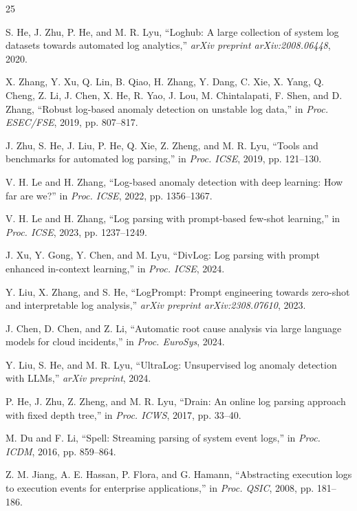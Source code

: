 \documentclass[conference]{IEEEtran}
\begin{document}


\begin{thebibliography}{25}

S. He, J. Zhu, P. He, and M. R. Lyu, ``Loghub: A large collection of system log datasets towards automated log analytics,'' \textit{arXiv preprint arXiv:2008.06448}, 2020.

X. Zhang, Y. Xu, Q. Lin, B. Qiao, H. Zhang, Y. Dang, C. Xie, X. Yang, Q. Cheng, Z. Li, J. Chen, X. He, R. Yao, J. Lou, M. Chintalapati, F. Shen, and D. Zhang, ``Robust log-based anomaly detection on unstable log data,'' in \textit{Proc. ESEC/FSE}, 2019, pp. 807--817.

J. Zhu, S. He, J. Liu, P. He, Q. Xie, Z. Zheng, and M. R. Lyu, ``Tools and benchmarks for automated log parsing,'' in \textit{Proc. ICSE}, 2019, pp. 121--130.

V. H. Le and H. Zhang, ``Log-based anomaly detection with deep learning: How far are we?'' in \textit{Proc. ICSE}, 2022, pp. 1356--1367.

V. H. Le and H. Zhang, ``Log parsing with prompt-based few-shot learning,'' in \textit{Proc. ICSE}, 2023, pp. 1237--1249.

J. Xu, Y. Gong, Y. Chen, and M. Lyu, ``DivLog: Log parsing with prompt enhanced in-context learning,'' in \textit{Proc. ICSE}, 2024.

Y. Liu, X. Zhang, and S. He, ``LogPrompt: Prompt engineering towards zero-shot and interpretable log analysis,'' \textit{arXiv preprint arXiv:2308.07610}, 2023.

J. Chen, D. Chen, and Z. Li, ``Automatic root cause analysis via large language models for cloud incidents,'' in \textit{Proc. EuroSys}, 2024.

Y. Liu, S. He, and M. R. Lyu, ``UltraLog: Unsupervised log anomaly detection with LLMs,'' \textit{arXiv preprint}, 2024.

P. He, J. Zhu, Z. Zheng, and M. R. Lyu, ``Drain: An online log parsing approach with fixed depth tree,'' in \textit{Proc. ICWS}, 2017, pp. 33--40.

M. Du and F. Li, ``Spell: Streaming parsing of system event logs,'' in \textit{Proc. ICDM}, 2016, pp. 859--864.

Z. M. Jiang, A. E. Hassan, P. Flora, and G. Hamann, ``Abstracting execution logs to execution events for enterprise applications,'' in \textit{Proc. QSIC}, 2008, pp. 181--186.


\end{thebibliography}
\end{document}

